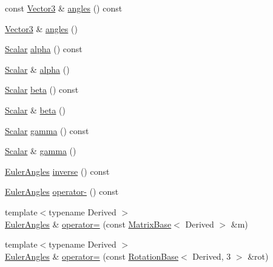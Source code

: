 \begin{DoxyCompactItemize}
\item 
const \hyperlink{class_eigen_1_1_euler_angles_af0f446aa0f46b3439abedff63fabf39c}{Vector3} \& \hyperlink{class_eigen_1_1_euler_angles_a2decf84b5efd265f7251fd32f539a36b}{angles} () const
\item 
\hyperlink{class_eigen_1_1_euler_angles_af0f446aa0f46b3439abedff63fabf39c}{Vector3} \& \hyperlink{class_eigen_1_1_euler_angles_afff76daa2d6a3165a1354c349366fb80}{angles} ()
\item 
\hyperlink{class_eigen_1_1_euler_angles_a2ab1d433ac9683268446f8905ac31aac}{Scalar} \hyperlink{class_eigen_1_1_euler_angles_a6146f78ee0fb9d9a7d685a4654066825}{alpha} () const
\item 
\hyperlink{class_eigen_1_1_euler_angles_a2ab1d433ac9683268446f8905ac31aac}{Scalar} \& \hyperlink{class_eigen_1_1_euler_angles_a69942a5a9b0c3670e7f2797e84cbde8c}{alpha} ()
\item 
\hyperlink{class_eigen_1_1_euler_angles_a2ab1d433ac9683268446f8905ac31aac}{Scalar} \hyperlink{class_eigen_1_1_euler_angles_a1bf59f8acaed985964c98c1f59d8f5ab}{beta} () const
\item 
\hyperlink{class_eigen_1_1_euler_angles_a2ab1d433ac9683268446f8905ac31aac}{Scalar} \& \hyperlink{class_eigen_1_1_euler_angles_a2db042cfba5486d46fdeb77fecd8e509}{beta} ()
\item 
\hyperlink{class_eigen_1_1_euler_angles_a2ab1d433ac9683268446f8905ac31aac}{Scalar} \hyperlink{class_eigen_1_1_euler_angles_aa75a5f16105d96eedf81bf9f8e789e21}{gamma} () const
\item 
\hyperlink{class_eigen_1_1_euler_angles_a2ab1d433ac9683268446f8905ac31aac}{Scalar} \& \hyperlink{class_eigen_1_1_euler_angles_a4c6216fa2fca4d5d70d8f44dae4cf88c}{gamma} ()
\item 
\hyperlink{class_eigen_1_1_euler_angles}{Euler\+Angles} \hyperlink{class_eigen_1_1_euler_angles_a1c37cedc590311d6ecaec7215d7c8f2c}{inverse} () const
\item 
\hyperlink{class_eigen_1_1_euler_angles}{Euler\+Angles} \hyperlink{class_eigen_1_1_euler_angles_a2a30e027e6f3fa275d7403c1c7e613af}{operator-\/} () const
\item 
{\footnotesize template$<$typename Derived $>$ }\\\hyperlink{class_eigen_1_1_euler_angles}{Euler\+Angles} \& \hyperlink{class_eigen_1_1_euler_angles_af11e32e3584251f0dce65811ac6ad3b4}{operator=} (const \hyperlink{group___core___module_class_eigen_1_1_matrix_base}{Matrix\+Base}$<$ Derived $>$ \&m)
\item 
{\footnotesize template$<$typename Derived $>$ }\\\hyperlink{class_eigen_1_1_euler_angles}{Euler\+Angles} \& \hyperlink{class_eigen_1_1_euler_angles_abc2256872ea7e285cb915b8af82b6810}{operator=} (const \hyperlink{class_eigen_1_1_rotation_base}{Rotation\+Base}$<$ Derived, 3 $>$ \&rot)

\end{DoxyCompactItemize}
